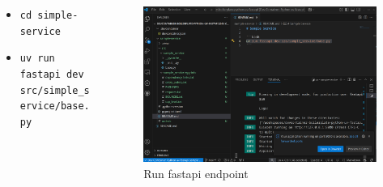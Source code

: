 \documentclass{beamer}
\begin{document}
\begin{frame}{\subsecname}
  \begin{columns}
    \begin{column}{0.5\textwidth}
      \begin{itemize}
        \item \texttt{cd simple-service}
        \item \texttt{uv run fastapi dev src/simple\_service/base.py}
      \end{itemize}
        \end{column}
        \begin{column}{0.5\textwidth}
      \begin{figure}
        \centering
        \includegraphics[width=\textwidth]{images/run-fastapi.png}
        \caption{Run fastapi endpoint}
      \end{figure}
        \end{column}
  \end{columns}
\end{frame}
\end{document}
